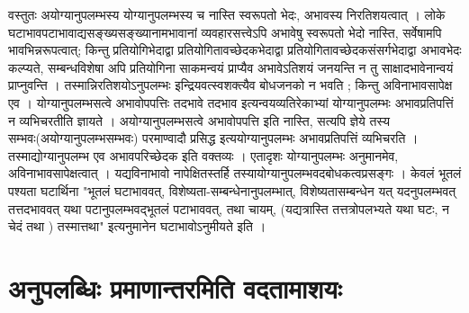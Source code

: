 वस्तुतः अयोग्यानुपलम्भस्य योग्यानुपलम्भस्य च नास्ति स्वरूपतो भेदः, अभावस्य निरतिशयत्वात् । लोके घटाभावपटाभावाद्यसङ्ख्यसङ्ख्यानामभावानां व्यवहारसत्त्वेऽपि अभावेषु स्वरूपतो भेदो नास्ति, सर्वेषामपि भावभिन्नरूपत्वात्; किन्तु प्रतियोगिभेदाद्वा प्रतियोगितावच्छेदकभेदाद्वा प्रतियोगितावच्छेदकसंसर्गभेदाद्वा अभावभेदः कल्प्यते, सम्बन्धविशेषा अपि प्रतियोगिना साकमन्वयं प्राप्यैव अभावेऽतिशयं जनयन्ति न तु साक्षादभावेनान्वयं प्राप्नुवन्ति । तस्मान्निरतिशयोऽनुपलम्भः इन्द्रियवत्स्वशक्त्यैव बोधजनको न भवति ; किन्तु अविनाभावसापेक्ष एव । योग्यानुपलम्भसत्वे अभावोपपत्तिः तदभावे तदभाव इत्यन्वयव्यतिरेकाभ्यां योग्यानुपलम्भः अभावप्रतिपत्तिं न व्यभिचरतीति ज्ञायते । अयोग्यानुपलम्भसत्वे अभावोपपत्ति इति नास्ति, सत्यपि ज्ञेये तस्य सम्भवः(अयोग्यानुपलम्भसम्भवः) परमाण्वादौ प्रसिद्ध इत्ययोग्यानुपलम्भः अभावप्रतिपत्तिं व्यभिचरति । तस्माद्योग्यानुपलम्भ एव अभावपरिच्छेदक इति वक्तव्यः । एतादृशः योग्यानुपलम्भः अनुमानमेव, अविनाभावसापेक्षत्वात् । यद्यविनाभावो नापेक्षितस्तर्हि तस्यायोग्यानुपलम्भवदबोधकत्वप्रसङ्गः । केवलं भूतलं पश्यता घटार्थिना "भूतलं घटाभाववत्, विशेष्यता-सम्बन्धेनानुपलम्भात्, विशेष्यतासम्बन्धेन यत् यदनुपलम्भवत् तत्तदभाववत् यथा पटानुपलम्भवद्भूतलं पटाभाववत्, तथा चायम्, (यद्यत्रास्ति तत्तत्रोपलभ्यते यथा घटः, न चेदं तथा ) तस्मात्तथा" इत्यनुमानेन घटाभावोऽनुमीयते इति ।

\section*{अनुपलब्धिः प्रमाणान्तरमिति वदतामाशयः} 

